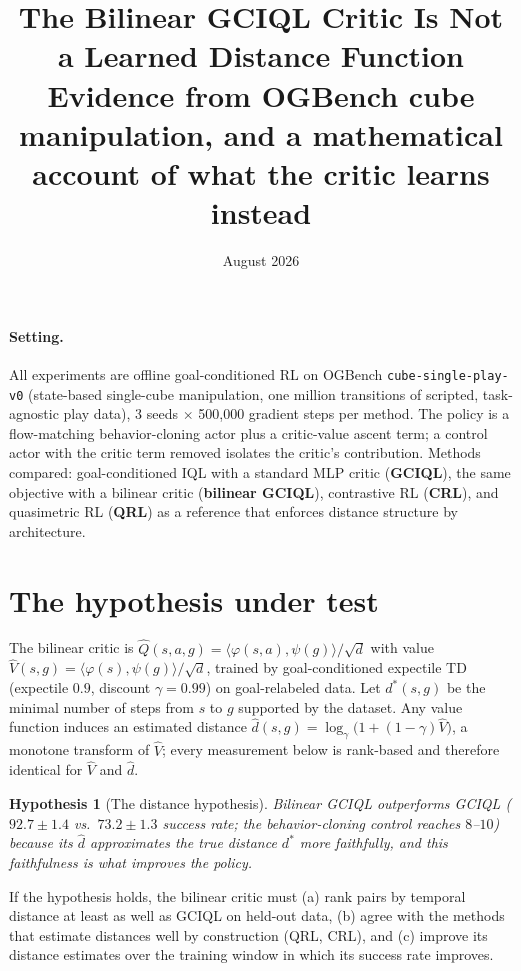 \documentclass[10pt]{article}
\title{\vspace{-2em}The Bilinear GCIQL Critic Is Not a Learned Distance Function\\
{\large Evidence from OGBench cube manipulation, and a mathematical account of what the
critic learns instead}}
\author{}
\date{August 2026}
\newtheorem{hypothesis}{Hypothesis}
\newcommand{\ip}[2]{\langle #1, #2 \rangle}
\begin{document}
\maketitle
\vspace{-3em}

\paragraph{Setting.} All experiments are offline goal-conditioned RL on OGBench
\texttt{cube-single-play-v0} (state-based single-cube manipulation, one million
transitions of scripted, task-agnostic play data), 3 seeds $\times$ 500{,}000 gradient
steps per method. The policy is a flow-matching behavior-cloning actor plus a critic-value
ascent term; a control actor with the critic term removed isolates the critic's
contribution. Methods compared: goal-conditioned IQL with a standard MLP critic
(\textbf{GCIQL}), the same objective with a bilinear critic (\textbf{bilinear GCIQL}),
contrastive RL (\textbf{CRL}), and quasimetric RL (\textbf{QRL}) as a reference that
enforces distance structure by architecture.

\section{The hypothesis under test}

The bilinear critic is $\hat Q(s,a,g)=\ip{\varphi(s,a)}{\psi(g)}/\sqrt d$ with value
$\hat V(s,g)=\ip{\varphi(s)}{\psi(g)}/\sqrt d$, trained by goal-conditioned expectile TD
(expectile $0.9$, discount $\gamma=0.99$) on goal-relabeled data. Let $d^*(s,g)$ be the
minimal number of steps from $s$ to $g$ supported by the dataset. Any value function
induces an estimated distance $\hat d(s,g) = \log_\gamma\!\big(1+(1-\gamma)\hat V\big)$,
a monotone transform of $\hat V$; every measurement below is rank-based and therefore
identical for $\hat V$ and $\hat d$.

\begin{hypothesis}[The distance hypothesis]\label{hyp:metric}
Bilinear GCIQL outperforms GCIQL ($92.7\pm1.4$ vs.\ $73.2\pm1.3$ success rate; the
behavior-cloning control reaches $8$--$10$) because its $\hat d$ approximates the true
distance $d^*$ more faithfully, and this faithfulness is what improves the policy.
\end{hypothesis}

If the hypothesis holds, the bilinear critic must (a) rank pairs by temporal distance at
least as well as GCIQL on held-out data, (b) agree with the methods that estimate
distances well by construction (QRL, CRL), and (c) improve its distance estimates over
the training window in which its success rate improves.
\end{document}
